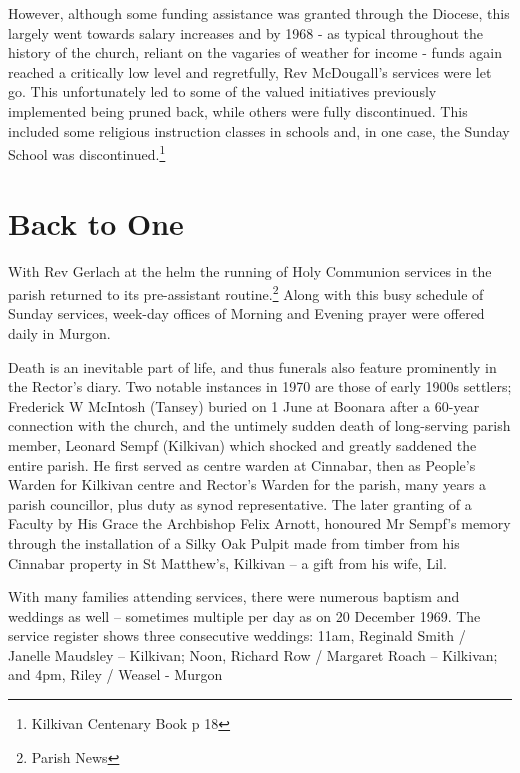 However, although some funding assistance was granted through the Diocese, this largely went towards salary increases and by 1968 - as typical throughout the history of the church, reliant on the vagaries of weather for income - funds again reached a critically low level and regretfully, Rev McDougall's services were let go. This unfortunately led to some of the valued initiatives previously implemented being pruned back, while others were fully discontinued. This included some religious instruction classes in schools and, in one case, the Sunday School was discontinued.\footnote{Kilkivan Centenary Book p 18}


\section{Back to One}



With Rev Gerlach at the helm the running of Holy Communion services in the parish returned to its pre-assistant routine.\footnote{Parish News} Along with this busy schedule of Sunday services, week-day offices of Morning and Evening prayer were offered daily in Murgon.


Death is an inevitable part of life, and thus funerals also feature prominently in the Rector's diary. Two notable instances in 1970 are those of early 1900s settlers; Frederick W McIntosh (Tansey) buried on 1 June at Boonara after a 60-year connection with the church, and the untimely sudden death of long-serving parish member, Leonard Sempf (Kilkivan) which shocked and greatly saddened the entire parish. He first served as centre warden at Cinnabar, then as People's Warden for Kilkivan centre and Rector's Warden for the parish, many years a parish councillor, plus duty as synod representative. The later granting of a Faculty by His Grace the Archbishop Felix Arnott, honoured Mr Sempf's memory through the installation of a Silky Oak Pulpit made from timber from his Cinnabar property in St Matthew's, Kilkivan -- a gift from his wife, Lil.



With many families attending services, there were numerous baptism and weddings as well -- sometimes multiple per day as on 20 December 1969. The service register shows three consecutive weddings: 11am, Reginald Smith / Janelle Maudsley -- Kilkivan; Noon, Richard Row / Margaret Roach -- Kilkivan; and 4pm, Riley / Weasel - Murgon



